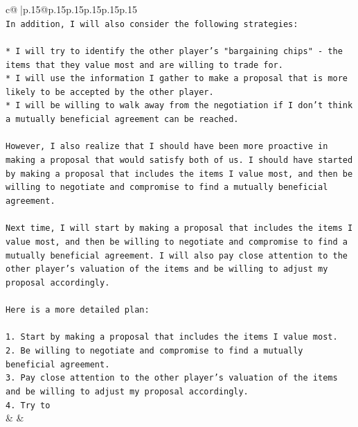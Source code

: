 \documentclass{article}
\begin{document}
{\begin{supertabular}{c@{$\;$}|p{.15\linewidth}@{}p{.15\linewidth}p{.15\linewidth}p{.15\linewidth}p{.15\linewidth}p{.15\linewidth}}
{{{\\ 
\texttt{In addition, I will also consider the following strategies:} \\
\\ 
\texttt{* I will try to identify the other player's "bargaining chips" {-} the items that they value most and are willing to trade for.} \\
\texttt{* I will use the information I gather to make a proposal that is more likely to be accepted by the other player.} \\
\texttt{* I will be willing to walk away from the negotiation if I don't think a mutually beneficial agreement can be reached.} \\
\\ 
\texttt{However, I also realize that I should have been more proactive in making a proposal that would satisfy both of us. I should have started by making a proposal that includes the items I value most, and then be willing to negotiate and compromise to find a mutually beneficial agreement.} \\
\\ 
\texttt{Next time, I will start by making a proposal that includes the items I value most, and then be willing to negotiate and compromise to find a mutually beneficial agreement. I will also pay close attention to the other player's valuation of the items and be willing to adjust my proposal accordingly.} \\
\\ 
\texttt{Here is a more detailed plan:} \\
\\ 
\texttt{1. Start by making a proposal that includes the items I value most.} \\
\texttt{2. Be willing to negotiate and compromise to find a mutually beneficial agreement.} \\
\texttt{3. Pay close attention to the other player's valuation of the items and be willing to adjust my proposal accordingly.} \\
\texttt{4. Try to} \\
            }
        }
    }
    & & \\ \\


\end{supertabular}}
\end{document}
